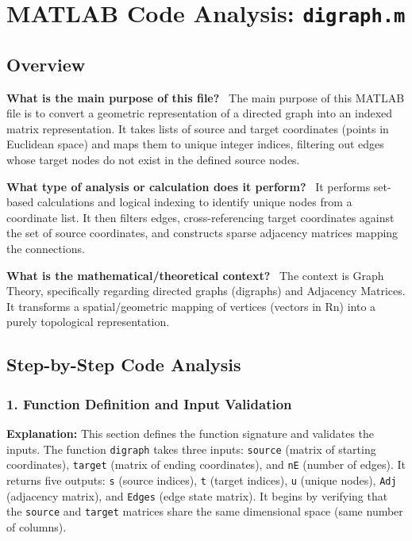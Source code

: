 
\chapter{MATLAB Code Analysis: \texttt{digraph.m}}
\author{Expert Software Engineer}
\date{}



\maketitle

\section{Overview}

\textbf{What is the main purpose of this file?} \
The main purpose of this MATLAB file is to convert a geometric representation of a directed graph into an indexed matrix representation. It takes lists of source and target coordinates (points in Euclidean space) and maps them to unique integer indices, filtering out edges whose target nodes do not exist in the defined source nodes.

\textbf{What type of analysis or calculation does it perform?} \
It performs set-based calculations and logical indexing to identify unique nodes from a coordinate list. It then filters edges, cross-referencing target coordinates against the set of source coordinates, and constructs sparse adjacency matrices mapping the connections.

\textbf{What is the mathematical/theoretical context?} \
The context is Graph Theory, specifically regarding directed graphs (digraphs) and Adjacency Matrices. It transforms a spatial/geometric mapping of vertices (vectors in Rn) into a purely topological representation.

\section{Step-by-Step Code Analysis}

\subsection{1. Function Definition and Input Validation}
\textbf{Explanation:}
This section defines the function signature and validates the inputs. The function \texttt{digraph} takes three inputs: \texttt{source} (matrix of starting coordinates), \texttt{target} (matrix of ending coordinates), and \texttt{nE} (number of edges). It returns five outputs: \texttt{s} (source indices), \texttt{t} (target indices), \texttt{u} (unique nodes), \texttt{Adj} (adjacency matrix), and \texttt{Edges} (edge state matrix). It begins by verifying that the \texttt{source} and \texttt{target} matrices share the same dimensional space (same number of columns).

